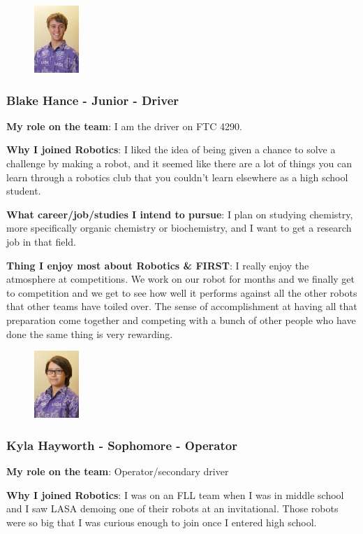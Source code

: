 \begin{figure}
	\centering
	\includegraphics[height=1in]{blake}
\end{figure}
\subsubsection{Blake Hance - Junior - Driver} 
{\bf My role on the team}: I am the driver on FTC 4290.

{\bf Why I joined Robotics}: I liked the idea of being given a chance to solve a challenge by making a robot, and it seemed like there are a lot of things you can learn through a robotics club that you couldn't learn elsewhere as a high school student.

{\bf What career/job/studies I intend to pursue}: I plan on studying chemistry, more specifically organic chemistry or biochemistry, and I want to get a research job in that field.

{\bf Thing I enjoy most about Robotics \& FIRST}: I really enjoy the atmosphere at competitions. We work on our robot for months and we finally get to competition and we get to see how well it performs against all the other robots that other teams have toiled over. The sense of accomplishment at having all that preparation come together and competing with a bunch of other people who have done the same thing is very rewarding.

\begin{figure}
	\centering
	\includegraphics[height=1in]{kyla}
\end{figure}
\subsubsection{Kyla Hayworth - Sophomore - Operator} 
{\bf My role on the team}: Operator/secondary driver

{\bf Why I joined Robotics}: I was on an FLL team when I was in middle school and I saw LASA demoing one of their robots at an invitational. Those robots were so big that I was curious enough to join once I entered high school.

